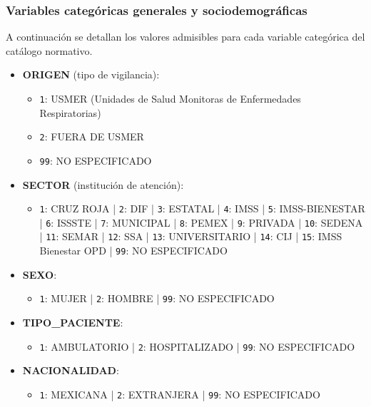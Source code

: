 \subsubsection{Variables categóricas generales y sociodemográficas}

A continuación se detallan los valores admisibles para cada variable categórica del catálogo normativo.

\begin{itemize}
    \item \textbf{ORIGEN} (tipo de vigilancia):
        \begin{itemize}
            \item \texttt{1}: USMER (Unidades de Salud Monitoras de Enfermedades Respiratorias)
            \item \texttt{2}: FUERA DE USMER
            \item \texttt{99}: NO ESPECIFICADO
        \end{itemize}

    \item \textbf{SECTOR} (institución de atención):
        \begin{itemize}
            \item \texttt{1}: CRUZ ROJA | \texttt{2}: DIF | \texttt{3}: ESTATAL | \texttt{4}: IMSS | \texttt{5}: IMSS-BIENESTAR | \texttt{6}: ISSSTE | \texttt{7}: MUNICIPAL | \texttt{8}: PEMEX | \texttt{9}: PRIVADA | \texttt{10}: SEDENA | \texttt{11}: SEMAR | \texttt{12}: SSA | \texttt{13}: UNIVERSITARIO | \texttt{14}: CIJ | \texttt{15}: IMSS Bienestar OPD | \texttt{99}: NO ESPECIFICADO
        \end{itemize}

    \item \textbf{SEXO}:
        \begin{itemize}
            \item \texttt{1}: MUJER | \texttt{2}: HOMBRE | \texttt{99}: NO ESPECIFICADO
        \end{itemize}

    \item \textbf{TIPO\_PACIENTE}:
        \begin{itemize}
            \item \texttt{1}: AMBULATORIO | \texttt{2}: HOSPITALIZADO | \texttt{99}: NO ESPECIFICADO
        \end{itemize}

    \item \textbf{NACIONALIDAD}:
        \begin{itemize}
            \item \texttt{1}: MEXICANA | \texttt{2}: EXTRANJERA | \texttt{99}: NO ESPECIFICADO
        \end{itemize}


\end{itemize}
